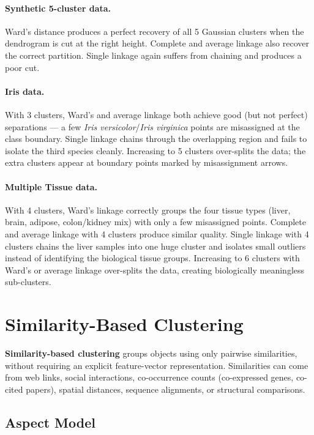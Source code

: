 \documentclass[11pt, oneside]{book}
\begin{document}
\paragraph{Synthetic 5-cluster data.}
Ward's distance produces a perfect recovery of all 5 Gaussian clusters when
the dendrogram is cut at the right height.
Complete and average linkage also recover the correct partition.
Single linkage again suffers from chaining and produces a poor cut.

\paragraph{Iris data.}
With 3 clusters, Ward's and average linkage both achieve good (but not perfect)
separations — a few \emph{Iris versicolor}/\emph{Iris virginica} points are
misassigned at the class boundary.
Single linkage chains through the overlapping region and fails to isolate the
third species cleanly.
Increasing to 5 clusters over-splits the data; the extra clusters appear at
boundary points marked by misassignment arrows.

\paragraph{Multiple Tissue data.}
With 4 clusters, Ward's linkage correctly groups the four tissue types
(liver, brain, adipose, colon/kidney mix) with only a few misassigned points.
Complete and average linkage with 4 clusters produce similar quality.
Single linkage with 4 clusters chains the liver samples into one huge cluster
and isolates small outliers instead of identifying the biological tissue groups.
Increasing to 6 clusters with Ward's or average linkage over-splits the data,
creating biologically meaningless sub-clusters.

\section{Similarity-Based Clustering}

\textbf{Similarity-based clustering} groups objects using only pairwise
similarities, without requiring an explicit feature-vector representation.
Similarities can come from web links, social interactions,
co-occurrence counts (co-expressed genes, co-cited papers),
spatial distances, sequence alignments, or structural comparisons.

\subsection{Aspect Model}
\end{document}
